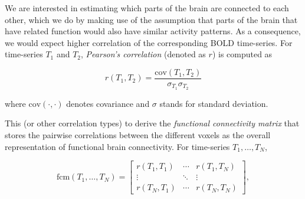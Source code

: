 We are interested in estimating which parts of the brain are connected to each other, which we do by making use of the assumption that parts of the brain that have related function would also have similar activity patterns. As a consequence, we would expect higher correlation of the corresponding BOLD time-series. For time-series $T_1$ and $T_2$, \textit{Pearson's correlation} (denoted as $r$) is computed as

\begin{equation}
    r(T_1, T_2) = \frac{\mathrm{cov}(T_1, T_2)}{\sigma_{T_1} \sigma_{T_2}}
\end{equation}

where $\mathrm{cov}(\cdot, \cdot)$ denotes covariance and $\sigma$ stands for standard deviation.



This (or other correlation types) to derive the \textit{functional connectivity matrix} that stores the pairwise correlations between the different voxels as the overall representation of functional brain connectivity. For time-series $T_1, \dots, T_N$,

\begin{equation}
    \mathrm{fcm}(T_1, \dots, T_N) = \begin{bmatrix}
        r(T_1, T_1) & \cdots & r(T_1, T_N) \\
        \vdots & \ddots & \vdots \\
        r(T_N, T_1) & \cdots & r(T_N, T_N)
    \end{bmatrix},
\end{equation}

